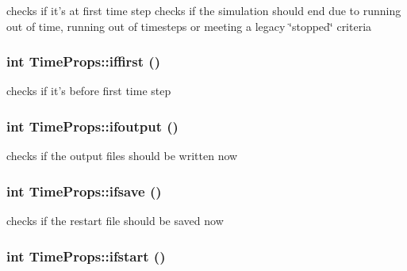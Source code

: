 checks if it's at first time step checks if the simulation should end due to running out of time, running out of timesteps or meeting a legacy \char`\"{}stopped\char`\"{} criteria 

\hypertarget{structTimeProps_a3}{
\subsubsection[iffirst]{\setlength{\rightskip}{0pt plus 5cm}int Time\-Props::iffirst ()}}
\label{structTimeProps_a3}


checks if it's before first time step 

\hypertarget{structTimeProps_a7}{
\subsubsection[ifoutput]{\setlength{\rightskip}{0pt plus 5cm}int Time\-Props::ifoutput ()}}
\label{structTimeProps_a7}


checks if the output files should be written now 

\hypertarget{structTimeProps_a6}{
\subsubsection[ifsave]{\setlength{\rightskip}{0pt plus 5cm}int Time\-Props::ifsave ()}}
\label{structTimeProps_a6}


checks if the restart file should be saved now 

\hypertarget{structTimeProps_a2}{
\subsubsection[ifstart]{\setlength{\rightskip}{0pt plus 5cm}int Time\-Props::ifstart ()}}
\label{structTimeProps_a2}


